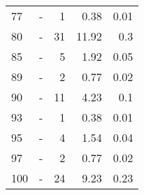 \begin{longtable}{lXrrr}
        77 & \multicolumn{1}{X}{-} & %
          \num{1} &
          \num[round-mode=places,round-precision=2]{0,38} &
          \num[round-mode=places,round-precision=2]{0,01} \\

        80 & \multicolumn{1}{X}{-} & %
          \num{31} &
          \num[round-mode=places,round-precision=2]{11,92} &
          \num[round-mode=places,round-precision=2]{0,3} \\

        85 & \multicolumn{1}{X}{-} & %
          \num{5} &
          \num[round-mode=places,round-precision=2]{1,92} &
          \num[round-mode=places,round-precision=2]{0,05} \\

        89 & \multicolumn{1}{X}{-} & %
          \num{2} &
          \num[round-mode=places,round-precision=2]{0,77} &
          \num[round-mode=places,round-precision=2]{0,02} \\

        90 & \multicolumn{1}{X}{-} & %
          \num{11} &
          \num[round-mode=places,round-precision=2]{4,23} &
          \num[round-mode=places,round-precision=2]{0,1} \\

        93 & \multicolumn{1}{X}{-} & %
          \num{1} &
          \num[round-mode=places,round-precision=2]{0,38} &
          \num[round-mode=places,round-precision=2]{0,01} \\

        95 & \multicolumn{1}{X}{-} & %
          \num{4} &
          \num[round-mode=places,round-precision=2]{1,54} &
          \num[round-mode=places,round-precision=2]{0,04} \\

        97 & \multicolumn{1}{X}{-} & %
          \num{2} &
          \num[round-mode=places,round-precision=2]{0,77} &
          \num[round-mode=places,round-precision=2]{0,02} \\

        100 & \multicolumn{1}{X}{-} & %
          \num{24} &
          \num[round-mode=places,round-precision=2]{9,23} &
          \num[round-mode=places,round-precision=2]{0,23} \\


\end{longtable}
